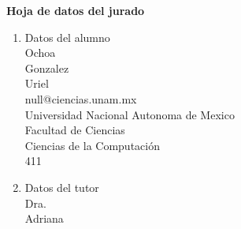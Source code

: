 \textbf{Hoja de datos del jurado}
\begin{enumerate}
\small
\item Datos del alumno\\
  Ochoa\\
  Gonzalez\\
  Uriel\\
  null@ciencias.unam.mx\\
  Universidad Nacional Autonoma de Mexico\\
  Facultad de Ciencias\\
  Ciencias de la Computación\\
  411

\item Datos del tutor\\
  Dra.\\
  Adriana









\end{enumerate}